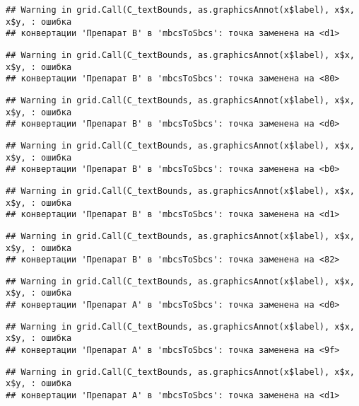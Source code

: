 \documentclass[
]{article}
\begin{document}
\begin{verbatim}
## Warning in grid.Call(C_textBounds, as.graphicsAnnot(x$label), x$x, x$y, : ошибка
## конвертации 'Препарат B' в 'mbcsToSbcs': точка заменена на <d1>
\end{verbatim}

\begin{verbatim}
## Warning in grid.Call(C_textBounds, as.graphicsAnnot(x$label), x$x, x$y, : ошибка
## конвертации 'Препарат B' в 'mbcsToSbcs': точка заменена на <80>
\end{verbatim}

\begin{verbatim}
## Warning in grid.Call(C_textBounds, as.graphicsAnnot(x$label), x$x, x$y, : ошибка
## конвертации 'Препарат B' в 'mbcsToSbcs': точка заменена на <d0>
\end{verbatim}

\begin{verbatim}
## Warning in grid.Call(C_textBounds, as.graphicsAnnot(x$label), x$x, x$y, : ошибка
## конвертации 'Препарат B' в 'mbcsToSbcs': точка заменена на <b0>
\end{verbatim}

\begin{verbatim}
## Warning in grid.Call(C_textBounds, as.graphicsAnnot(x$label), x$x, x$y, : ошибка
## конвертации 'Препарат B' в 'mbcsToSbcs': точка заменена на <d1>
\end{verbatim}

\begin{verbatim}
## Warning in grid.Call(C_textBounds, as.graphicsAnnot(x$label), x$x, x$y, : ошибка
## конвертации 'Препарат B' в 'mbcsToSbcs': точка заменена на <82>
\end{verbatim}

\begin{verbatim}
## Warning in grid.Call(C_textBounds, as.graphicsAnnot(x$label), x$x, x$y, : ошибка
## конвертации 'Препарат A' в 'mbcsToSbcs': точка заменена на <d0>
\end{verbatim}

\begin{verbatim}
## Warning in grid.Call(C_textBounds, as.graphicsAnnot(x$label), x$x, x$y, : ошибка
## конвертации 'Препарат A' в 'mbcsToSbcs': точка заменена на <9f>
\end{verbatim}

\begin{verbatim}
## Warning in grid.Call(C_textBounds, as.graphicsAnnot(x$label), x$x, x$y, : ошибка
## конвертации 'Препарат A' в 'mbcsToSbcs': точка заменена на <d1>
\end{verbatim}
\end{document}
